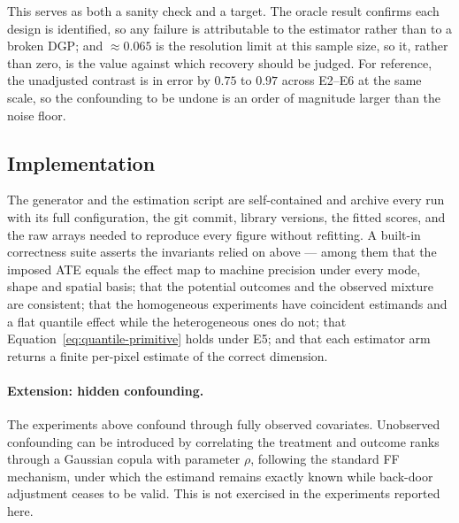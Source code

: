 This serves as both a sanity check and a target. The oracle result confirms each design is
identified, so any failure is attributable to the estimator rather than to a broken DGP; and
$\approx 0.065$ is the resolution limit at this sample size, so it, rather than zero, is the
value against which recovery should be judged. For reference, the unadjusted contrast is in
error by $0.75$ to $0.97$ across E2--E6 at the same scale, so the confounding to be undone is
an order of magnitude larger than the noise floor.

\subsection{Implementation}

The generator and the estimation script are self-contained and archive every run with its full
configuration, the git commit, library versions, the fitted scores, and the raw arrays needed
to reproduce every figure without refitting. A built-in correctness suite asserts the
invariants relied on above --- among them that the imposed ATE equals the effect map to
machine precision under every mode, shape and spatial basis; that the potential outcomes and
the observed mixture are consistent; that the homogeneous experiments have coincident
estimands and a flat quantile effect while the heterogeneous ones do not; that
Equation~\eqref{eq:quantile-primitive} holds under E5; and that each estimator arm returns a
finite per-pixel estimate of the correct dimension.

\paragraph{Extension: hidden confounding.} The experiments above confound through fully
observed covariates. Unobserved confounding can be introduced by correlating the treatment and
outcome ranks through a Gaussian copula with parameter $\rho$, following the standard FF
mechanism, under which the estimand remains exactly known while back-door adjustment ceases to
be valid. This is not exercised in the experiments reported here.
